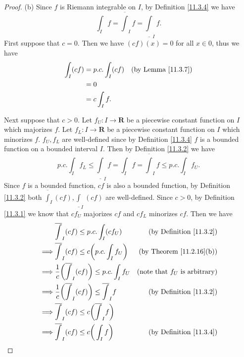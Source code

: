 \begin{proof}{(b)}
    Since \(f\) is Riemann integrable on \(I\), by Definition \ref{11.3.4} we have
    \[
        \int_I f = \overline{\int}_I f = \underline{\int}_I f.
    \]
    First suppose that \(c = 0\).
    Then we have \((cf)(x) = 0\) for all \(x \in 0\), thus we have
    \begin{align*}
        \int_I (cf) & = p.c. \int_I (cf) & \text{(by Lemma \ref{11.3.7})} \\
                    & = 0                                                 \\
                    & = c \int_I f.
    \end{align*}

    Next suppose that \(c > 0\).
    Let \(f_U : I \to \mathbf{R}\) be a piecewise constant function on \(I\) which majorizes \(f\).
    Let \(f_L : I \to \mathbf{R}\) be a piecewise constant function on \(I\) which minorizes \(f\).
    \(f_U, f_L\) are well-defined since by Definition \ref{11.3.4} \(f\) is a bounded function on a bounded interval \(I\).
    Then by Definition \ref{11.3.2} we have
    \[
        p.c. \int_I f_L \leq \underline{\int}_I f = \int_I f = \overline{\int}_I f \leq p.c. \int_I f_U.
    \]
    Since \(f\) is a bounded function, \(cf\) is also a bounded function, by Definition \ref{11.3.2} both \(\overline{\int}_I (cf), \underline{\int}_I (cf)\) are well-defined.
    Since \(c > 0\), by Definition \ref{11.3.1} we know that \(c f_U\) majorizes \(c f\) and \(c f_L\) minorizes \(c f\).
    Then we have
    \begin{align*}
                 & \overline{\int}_I (cf) \leq p.c. \int_I (c f_U)                         & \text{(by Definition \ref{11.3.2})}     \\
        \implies & \overline{\int}_I (cf) \leq c \bigg(p.c. \int_I f_U\bigg)               & \text{(by Theorem \ref{11.2.16}(b))}    \\
        \implies & \frac{1}{c} \bigg(\overline{\int}_I (cf)\bigg) \leq p.c. \int_I f_U     & \text{(note that \(f_U\) is arbitrary)} \\
        \implies & \frac{1}{c} \bigg(\overline{\int}_I (cf)\bigg) \leq \overline{\int}_I f & \text{(by Definition \ref{11.3.2})}     \\
        \implies & \overline{\int}_I (cf) \leq c\bigg(\overline{\int}_I f\bigg)                                                      \\
        \implies & \overline{\int}_I (cf) \leq c\bigg(\int_I f\bigg)                       & \text{(by Definition \ref{11.3.4})}

\end{align*}
\end{proof}
